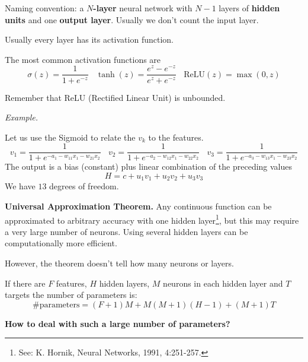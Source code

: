 Naming convention: a $N$\textbf{-layer} neural network with $N-1$ layers of \textbf{hidden units} and one \textbf{output layer}. Usually we don't count the input layer.

Usually every layer has its activation function.


The most common activation functions are
\begin{equation*}
    \sigma ( z) =\frac{1}{1+e^{-z}} \ \ \ \ \tanh( z) =\frac{e^{z} -e^{-z}}{e^{z} +e^{-z}} \ \ \ \ \text{ReLU}( z) =\max( 0,z)
\end{equation*}


Remember that ReLU (Rectified Linear Unit) is unbounded.

\textit{Example.}


Let us use the Sigmoid to relate the $v_{k}$ to the features.
\begin{equation*}
    v_{1} =\frac{1}{1+e^{-a_{1} -w_{11} x_{1} -w_{21} x_{2}}} \ \ \ \ v_{2} =\frac{1}{1+e^{-a_{2} -w_{12} x_{1} -w_{22} x_{2}}} \ \ \ \ v_{3} =\frac{1}{1+e^{-a_{3} -w_{13} x_{1} -w_{23} x_{2}}}
\end{equation*}
The output is a bias (constant) plus linear combination of the preceding values
\begin{equation*}
    H=c+u_{1} v_{1} +u_{2} v_{2} +u_{3} v_{3}
\end{equation*}
We have $13$ degrees of freedom.

\textbf{Universal Approximation Theorem. }Any continuous function can be approximated to arbitrary accuracy with one hidden layer\footnote{See: K. Hornik, Neural Networks, 1991, 4:251-257.}, but this may require a very large number of neurons. Using several hidden layers can be computationally more efficient.

However, the theorem doesn't tell how many neurons or layers.

If there are $F$ features, $H$ hidden layers, $M$ neurons in each hidden layer and $T$ targets the number of parameters is:
\begin{equation*}
    \text{\#parameters} =( F+1) M+M( M+1)( H-1) +( M+1) T
\end{equation*}

\textbf{How to deal with such a large number of parameters?}

